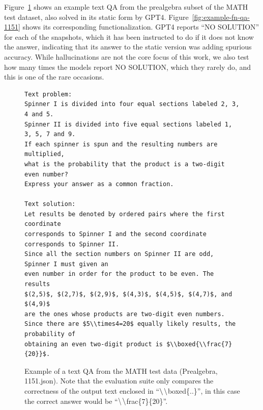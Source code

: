 \documentclass[11pt,a4paper]{article}
\newcommand{\bsl}[0]{\ensuremath{\textrm\textbackslash}}
\begin{document}
Figure~\ref{fig:example-text-qa-1151} shows an example text QA from the prealgebra subset of the MATH test dataset, also solved in its static form by GPT4. Figure~\ref{fig:example-fn-qa-1151} shows its corresponding functionalization. GPT4 reports ``NO SOLUTION'' for each of the snapshots, which it has been instructed to do if it does not know the answer, indicating that its answer to the static version was adding spurious accuracy. While hallucinations are not the core focus of this work, we also test how many times the models report NO SOLUTION, which they rarely do, and this is one of the rare occasions.
\begin{figure}
\small
\begin{verbatim}
Text problem:
Spinner I is divided into four equal sections labeled 2, 3, 4 and 5.
Spinner II is divided into five equal sections labeled 1, 3, 5, 7 and 9.
If each spinner is spun and the resulting numbers are multiplied,
what is the probability that the product is a two-digit even number?
Express your answer as a common fraction.

Text solution:
Let results be denoted by ordered pairs where the first coordinate
corresponds to Spinner I and the second coordinate corresponds to Spinner II.
Since all the section numbers on Spinner II are odd, Spinner I must given an
even number in order for the product to be even. The results
$(2,5)$, $(2,7)$, $(2,9)$, $(4,3)$, $(4,5)$, $(4,7)$, and $(4,9)$
are the ones whose products are two-digit even numbers.
Since there are $5\\times4=20$ equally likely results, the probability of
obtaining an even two-digit product is $\\boxed{\\frac{7}{20}}$.
\end{verbatim}
\caption{\label{fig:example-text-qa-1151} Example of a text QA from the MATH test data (Prealgebra, 1151.json). Note that the evaluation suite only compares the correctness of the output text enclosed in ``\bsl\bsl boxed\{..\}'', in this case the correct answer would be ``\bsl\bsl frac\{7\}\{20\}''.}
\end{figure}
\end{document}
